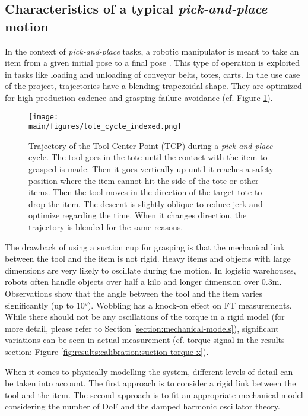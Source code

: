 \documentclass[/home/francois/latex/report/main.tex]{subfiles}
\begin{document}
\subsection{Characteristics of a typical \textit{pick-and-place} motion}
\label{background:motion}

In the context of \textit{pick-and-place} tasks, a robotic manipulator is meant to
take an item from a given initial pose to a final pose \cite{Angeles2006}. This type of operation is exploited in tasks like loading and unloading of conveyor belts, totes, carts. In the use case of the project, trajectories have a blending trapezoidal shape. They are optimized for high production cadence and grasping failure avoidance (cf. Figure \ref{fig:background:tote_cycle}).

\begin{figure}[h]
  \centering
  \texttt{[image: \\main/figures/tote\_cycle\_indexed.png]}
  \caption{Trajectory of the Tool Center Point (TCP) during a \textit{pick-and-place} cycle. The tool goes in the tote until the contact with the item to grasped is made. Then it goes vertically up until it reaches a safety position where the item cannot hit the side of the tote or other items. Then the tool moves in the direction of the target tote to drop the item. The descent is slightly oblique to reduce jerk and optimize regarding the time. When it changes direction, the trajectory is blended for the same reasons.}
  \label{fig:background:tote_cycle}
\end{figure}

The drawback of using a suction cup for grasping is that the mechanical link between the tool and the item is not rigid. Heavy items and objects with large dimensions are very likely to oscillate during the motion. In logistic warehouses, robots often handle objects over half a kilo and longer dimension over $0.3 \si{\meter}$. Observations show that the angle between the tool and the item varies significantly (up to $10 \si{\degree}$). Wobbling has a knock-on effect on \ac{FT} measurements. While there should not be any oscillations of the torque in a rigid model (for more detail, please refer to Section \ref{section:mechanical-models}), significant variations can be seen in actual measurement (cf. torque signal in the results section:   Figure \ref{fig:results:calibration:suction-torque-x}).

When it comes to physically modelling the system, different levels of detail can be taken into account. The first approach is to consider a rigid link between the tool and the item. The second approach is to fit an appropriate mechanical model considering the number of \ac{DoF} and the damped harmonic oscillator theory.
\end{document}
